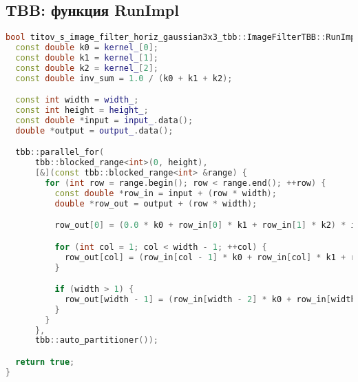 \documentclass[12pt]{article}
\begin{document}
\subsection*{TBB: функция RunImpl}
\begin{lstlisting}[language=C++]
bool titov_s_image_filter_horiz_gaussian3x3_tbb::ImageFilterTBB::RunImpl() {
  const double k0 = kernel_[0];
  const double k1 = kernel_[1];
  const double k2 = kernel_[2];
  const double inv_sum = 1.0 / (k0 + k1 + k2);

  const int width = width_;
  const int height = height_;
  const double *input = input_.data();
  double *output = output_.data();

  tbb::parallel_for(
      tbb::blocked_range<int>(0, height),
      [&](const tbb::blocked_range<int> &range) {
        for (int row = range.begin(); row < range.end(); ++row) {
          const double *row_in = input + (row * width);
          double *row_out = output + (row * width);

          row_out[0] = (0.0 * k0 + row_in[0] * k1 + row_in[1] * k2) * inv_sum;

          for (int col = 1; col < width - 1; ++col) {
            row_out[col] = (row_in[col - 1] * k0 + row_in[col] * k1 + row_in[col + 1] * k2) * inv_sum;
          }

          if (width > 1) {
            row_out[width - 1] = (row_in[width - 2] * k0 + row_in[width - 1] * k1 + 0.0 * k2) * inv_sum;
          }
        }
      },
      tbb::auto_partitioner());

  return true;
}
\end{lstlisting}
\end{document}
